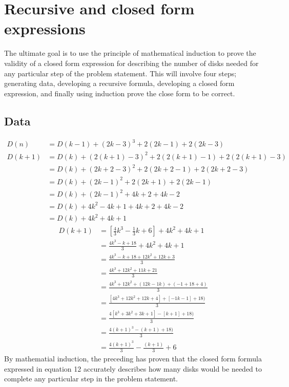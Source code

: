 \documentclass[11pt]{article}
\begin{document}
	\section{Recursive and closed form expressions}
		The ultimate goal is to use the principle of mathematical induction to prove the validity of a closed form expression 
		for describing the number of disks needed for any particular step of the problem statement.  This will involve four 
		steps; generating data, developing a recursive formula, developing a closed form expression, and finally using induction 
 		prove the close form to be correct.
	
	\subsection{Data}
		

	\begin{align}
		D(n)&= D(k-1)+(2k-3)^3+2(2k-1)+2(2k-3)\\
		D(k+1)&=D(k)+(2(k+1)-3)^2+2(2(k+1)-1)+2(2(k+1)-3)\\
		&=D(k)+(2k+2-3)^2+2(2k+2-1)+2(2k+2-3)\\
		&=D(k)+(2k-1)^2+2(2k+1)+2(2k-1)\\
		&=D(k)+(2k-1)^2+4k+2+4k-2\\
		&=D(k)+4k^2-4k+1+4k+2+4k-2\\
		&=D(k)+4k^2+4k+1		
	\end{align}
	\begin{align}
		D(k+1)&=[\frac{4}{3}k^3-\frac{1}{3}k+6]+4k^2+4k+1\\	
		&=\frac{4k^3-k+18}{3}+4k^2+4k+1\\
		&=\frac{4k^3-k+18+12k^2+12k+3}{3}\\
		&=\frac{4k^3+12k^2+11k+21}{3}\\
		&=\frac{4k^3+12k^2+(12k-1k)+(-1+18+4)}{3}\\
		&=\frac{[4k^3+12k^2+12k+4]+[-1k-1]+18)}{3}\\
		&=\frac{4[k^3+3k^2+3k+1]-[k+1]+18)}{3}\\
		&=\frac{4(k+1)^3-(k+1)+18)}{3}\\
		&=\frac{4(k+1)^3}{3}-\frac{(k+1)}{3}+6
	\end{align}
	By mathematial induction, the preceding has proven that the closed form formula expressed in equation 12 accurately describes how many 
	disks would be needed to complete any particular step in the problem statement.
\end{document}
